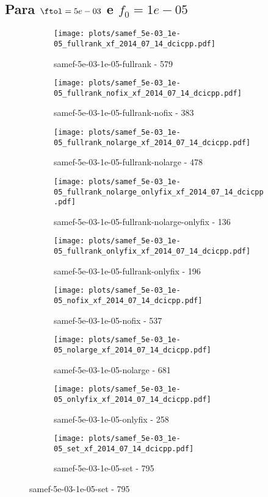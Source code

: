 \newpage
\subsection{Para $\ftol = 5e-03$ e $f_0 = 1e-05$}

\begin{figure}[H]
  \centering
  \begin{subfigure}{0.48\textwidth}
    \texttt{[image: plots/samef\_5e-03\_1e-05\_fullrank\_xf\_2014\_07\_14\_dcicpp.pdf]}
    \caption{samef-5e-03-1e-05-fullrank - 579}
  \end{subfigure}
  \begin{subfigure}{0.48\textwidth}
    \texttt{[image: plots/samef\_5e-03\_1e-05\_fullrank\_nofix\_xf\_2014\_07\_14\_dcicpp.pdf]}
    \caption{samef-5e-03-1e-05-fullrank-nofix - 383}
  \end{subfigure}
  \begin{subfigure}{0.48\textwidth}
    \texttt{[image: plots/samef\_5e-03\_1e-05\_fullrank\_nolarge\_xf\_2014\_07\_14\_dcicpp.pdf]}
    \caption{samef-5e-03-1e-05-fullrank-nolarge - 478}
  \end{subfigure}
  \begin{subfigure}{0.48\textwidth}
    \texttt{[image: plots/samef\_5e-03\_1e-05\_fullrank\_nolarge\_onlyfix\_xf\_2014\_07\_14\_dcicpp.pdf]}
    \caption{samef-5e-03-1e-05-fullrank-nolarge-onlyfix - 136}
  \end{subfigure}
  \begin{subfigure}{0.48\textwidth}
    \texttt{[image: plots/samef\_5e-03\_1e-05\_fullrank\_onlyfix\_xf\_2014\_07\_14\_dcicpp.pdf]}
    \caption{samef-5e-03-1e-05-fullrank-onlyfix - 196}
  \end{subfigure}
  \begin{subfigure}{0.48\textwidth}
    \texttt{[image: plots/samef\_5e-03\_1e-05\_nofix\_xf\_2014\_07\_14\_dcicpp.pdf]}
    \caption{samef-5e-03-1e-05-nofix - 537}
  \end{subfigure}
  \begin{subfigure}{0.48\textwidth}
    \texttt{[image: plots/samef\_5e-03\_1e-05\_nolarge\_xf\_2014\_07\_14\_dcicpp.pdf]}
    \caption{samef-5e-03-1e-05-nolarge - 681}
  \end{subfigure}
  \begin{subfigure}{0.48\textwidth}
    \texttt{[image: plots/samef\_5e-03\_1e-05\_onlyfix\_xf\_2014\_07\_14\_dcicpp.pdf]}
    \caption{samef-5e-03-1e-05-onlyfix - 258}
  \end{subfigure}
  \begin{subfigure}{0.48\textwidth}
    \texttt{[image: plots/samef\_5e-03\_1e-05\_set\_xf\_2014\_07\_14\_dcicpp.pdf]}
    \caption{samef-5e-03-1e-05-set - 795}
  \end{subfigure}
\end{figure}

